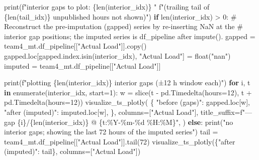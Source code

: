 \documentclass[
  english,
  letterpaper,
]{scrbook}
\newenvironment{Shaded}{\begin{snugshade}}{\end{snugshade}}
\newcommand{\BuiltInTok}[1]{\textcolor[rgb]{0.00,0.23,0.31}{#1}}
\newcommand{\CommentTok}[1]{\textcolor[rgb]{0.37,0.37,0.37}{#1}}
\newcommand{\ControlFlowTok}[1]{\textcolor[rgb]{0.00,0.23,0.31}{\textbf{#1}}}
\newcommand{\DecValTok}[1]{\textcolor[rgb]{0.68,0.00,0.00}{#1}}
\newcommand{\KeywordTok}[1]{\textcolor[rgb]{0.00,0.23,0.31}{\textbf{#1}}}
\newcommand{\NormalTok}[1]{\textcolor[rgb]{0.00,0.23,0.31}{#1}}
\newcommand{\OperatorTok}[1]{\textcolor[rgb]{0.37,0.37,0.37}{#1}}
\newcommand{\SpecialCharTok}[1]{\textcolor[rgb]{0.37,0.37,0.37}{#1}}
\newcommand{\SpecialStringTok}[1]{\textcolor[rgb]{0.13,0.47,0.30}{#1}}
\newcommand{\StringTok}[1]{\textcolor[rgb]{0.13,0.47,0.30}{#1}}
\begin{document}
\begin{Shaded}
\begin{Highlighting}[]
\BuiltInTok{print}\NormalTok{(}\SpecialStringTok{f"interior gaps to plot: }\SpecialCharTok{\{}\BuiltInTok{len}\NormalTok{(interior\_idx)}\SpecialCharTok{\}}\SpecialStringTok{  "}
      \SpecialStringTok{f"(trailing tail of }\SpecialCharTok{\{}\BuiltInTok{len}\NormalTok{(tail\_idx)}\SpecialCharTok{\}}\SpecialStringTok{ unpublished hours not shown)"}\NormalTok{)}
\ControlFlowTok{if} \BuiltInTok{len}\NormalTok{(interior\_idx) }\OperatorTok{\textgreater{}} \DecValTok{0}\NormalTok{:}
    \CommentTok{\# Reconstruct the pre{-}imputation (gapped) series by re{-}inserting NaN at the}
    \CommentTok{\# interior gap positions; the imputed series is df\_pipeline after impute().}
\NormalTok{    gapped }\OperatorTok{=}\NormalTok{ team4\_mt.df\_pipeline[[}\StringTok{"Actual Load"}\NormalTok{]].copy()}
\NormalTok{    gapped.loc[gapped.index.isin(interior\_idx), }\StringTok{"Actual Load"}\NormalTok{] }\OperatorTok{=} \BuiltInTok{float}\NormalTok{(}\StringTok{"nan"}\NormalTok{)}
\NormalTok{    imputed }\OperatorTok{=}\NormalTok{ team4\_mt.df\_pipeline[[}\StringTok{"Actual Load"}\NormalTok{]]}

    \BuiltInTok{print}\NormalTok{(}\SpecialStringTok{f"plotting }\SpecialCharTok{\{}\BuiltInTok{len}\NormalTok{(interior\_idx)}\SpecialCharTok{\}}\SpecialStringTok{ interior gaps (±12 h window each)"}\NormalTok{)}
    \ControlFlowTok{for}\NormalTok{ i, t }\KeywordTok{in} \BuiltInTok{enumerate}\NormalTok{(interior\_idx, start}\OperatorTok{=}\DecValTok{1}\NormalTok{):}
\NormalTok{        w }\OperatorTok{=} \BuiltInTok{slice}\NormalTok{(t }\OperatorTok{{-}}\NormalTok{ pd.Timedelta(hours}\OperatorTok{=}\DecValTok{12}\NormalTok{), t }\OperatorTok{+}\NormalTok{ pd.Timedelta(hours}\OperatorTok{=}\DecValTok{12}\NormalTok{))}
\NormalTok{        visualize\_ts\_plotly(}
\NormalTok{            \{}
                \StringTok{"before (gaps)"}\NormalTok{:   gapped.loc[w],}
                \StringTok{"after (imputed)"}\NormalTok{: imputed.loc[w],}
\NormalTok{            \},}
\NormalTok{            columns}\OperatorTok{=}\NormalTok{[}\StringTok{"Actual Load"}\NormalTok{],}
\NormalTok{            title\_suffix}\OperatorTok{=}\SpecialStringTok{f"— gap }\SpecialCharTok{\{}\NormalTok{i}\SpecialCharTok{\}}\SpecialStringTok{/}\SpecialCharTok{\{}\BuiltInTok{len}\NormalTok{(interior\_idx)}\SpecialCharTok{\}}\SpecialStringTok{ @ }\SpecialCharTok{\{}\NormalTok{t}\SpecialCharTok{:}\OperatorTok{\%}\NormalTok{Y}\OperatorTok{{-}\%}\NormalTok{m}\OperatorTok{{-}\%}\NormalTok{d }\OperatorTok{\%}\NormalTok{H}\SpecialCharTok{:}\OperatorTok{\%}\NormalTok{M}\SpecialCharTok{\}}\SpecialStringTok{"}\NormalTok{,}
\NormalTok{        )}
\ControlFlowTok{else}\NormalTok{:}
    \BuiltInTok{print}\NormalTok{(}\StringTok{"no interior gaps; showing the last 72 hours of the imputed series"}\NormalTok{)}
\NormalTok{    tail }\OperatorTok{=}\NormalTok{ team4\_mt.df\_pipeline[[}\StringTok{"Actual Load"}\NormalTok{]].tail(}\DecValTok{72}\NormalTok{)}
\NormalTok{    visualize\_ts\_plotly(\{}\StringTok{"after (imputed)"}\NormalTok{: tail\}, columns}\OperatorTok{=}\NormalTok{[}\StringTok{"Actual Load"}\NormalTok{])}
\end{Highlighting}
\end{Shaded}
\end{document}
